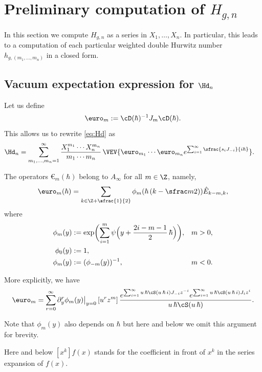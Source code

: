 \section{Preliminary computation of \texorpdfstring{$H_{g,n}$}{Hgn}} \label{sec:preliminary}

In this section we compute $H_{g,n}$ as a series in $X_1,\dots,X_n$. In particular, this leads to a computation of each particular weighted double Hurwitz number $h_{g,(m_1,\dots,m_n)}$ in a closed form.

\subsection{Vacuum expectation expression for \texorpdfstring{$\Hd_n$}{Hn disconnected}}
Let us define
\begin{equation*}
\euro_m:=\cD(\hbar)^{-1}J_{m}\cD(\hbar).
\end{equation*}
This allows us to rewrite \eqref{eq:Hd} as
\begin{align}\label{eq:Hdisc1}
\Hd_n
&=\sum_{m_1,\dots,m_n=1}^\infty
\frac{X_1^{m_1}\cdots X_n^{m_n}}{m_1\cdots m_n}\,
\VEV{\euro_{m_1}\cdots \euro_{m_n}e^{\sum_{i=1}^\infty \sfrac{s_i J_{-i}}{i\hbar} }}.
\end{align}

\begin{proposition}\label{prop:OperJJ}
The operators $\euro_m(\hbar)$ belong to $A_\infty$ for all $m\in\Z$, namely,
\begin{equation}\label{eq:DJD}
\euro_m(\hbar) =\sum_{k\in\Z+\sfrac{1}{2}}\phi_m(\hbar\,(k-\sfrac m2))\hat E_{k-m,k},
\end{equation}
where
\begin{align}\label{eq:phimdef}
\phi_m(y)
&:=\exp\biggl(\sum_{i=1}^{m}\psi\Bigl(y+\dfrac{2i-m-1}{2}\, \hbar\Bigr)\biggr),&m>0,\\ \label{eq:phi0def}
\phi_0(y)&:=1,&\\
\notag\phi_m(y)&:=(\phi_{-m}(y))^{-1},&m<0.
\end{align}

More explicitly, we have
\begin{equation}\label{eq:euroJ}
\euro_m = \sum_{r=0}^\infty\partial_y^r\phi_m(y)\big|_{y=0}\,[u^rz^m]\,
\frac{
e^{\sum_{i=1}^\infty u\,\hbar\cS(u\,\hbar\,i) J_{-i}z^{-i}}
e^{\sum_{i=1}^\infty u\,\hbar \cS(u\,\hbar\,i) J_{i}z^{i}}}
{u\,\hbar\cS(u\,\hbar)}.
\end{equation}
\end{proposition}
\noindent Note that $\phi_m(y)$ also depends on $\hbar$ but here and below we omit this argument for brevity.
\begin{notation}
Here and below $[x^k]f(x)$ stands for the coefficient in front of $x^k$ in the series expansion of $f(x)$.
\end{notation}

